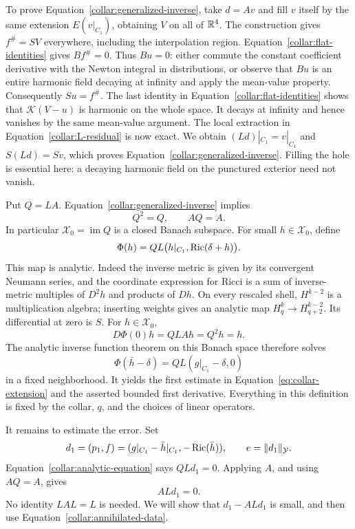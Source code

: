 To prove Equation~\eqref{collar:generalized-inverse}, take \(d=Av\)
and fill \(v\) itself by the same extension \(E(v|_{C_1})\), obtaining
\(V\) on all of \(\mathbb{R}^4\).  The construction gives \(f^\#=SV\)
everywhere, including the interpolation region.  Equation~\eqref{collar:flat-identities}
gives \(Bf^\#=0\).  Thus \(Bu=0\): either commute the constant
coefficient derivative with the Newton integral in distributions,
or observe that \(Bu\) is an entire harmonic field decaying at
infinity and apply the mean-value property.  Consequently
\(Su=f^\#\).  The last identity in Equation~\eqref{collar:flat-identities}
shows that \(\mathcal K(V-u)\) is harmonic on the whole space.
It decays at infinity and hence vanishes by the same mean-value
argument.  The local extraction in Equation~\eqref{collar:L-residual}
is now exact.  We obtain \((Ld)|_{C_1}=v|_{C_1}\) and \(S(Ld)=Sv\),
which proves Equation~\eqref{collar:generalized-inverse}.  Filling
the hole is essential here: a decaying harmonic field on the
punctured exterior need not vanish.

Put \(Q=LA\).  Equation~\eqref{collar:generalized-inverse} implies
\[
 Q^2=Q,\qquad AQ=A.
\]
In particular \(\mathcal X_0=\operatorname{im}Q\) is a closed
Banach subspace.  For small \(h\in\mathcal X_0\), define
\[
 \Phi(h)=QL\bigl(h|_{C_1},\operatorname{Ric}(\delta+h)\bigr).
\]
This map is analytic.  Indeed the inverse metric is given by its
convergent Neumann series, and the coordinate expression for Ricci
is a sum of inverse-metric multiples of \(D^2h\) and products of
\(Dh\).  On every rescaled shell, \(H^{k-2}\) is a multiplication
algebra; inserting weights gives an analytic map
\(H^k_q\to H^{k-2}_{q+2}\).  Its differential at zero is \(S\).
For \(h\in\mathcal X_0\),
\[
 D\Phi(0)h=QLAh=Q^2h=h.
\]
The analytic inverse function theorem on this Banach space
therefore solves
\begin{equation}
 \Phi(\bar h-\delta)=QL(g|_{C_1}-\delta,0)
 \label{collar:analytic-equation}
\end{equation}
in a fixed neighborhood.  It yields the first estimate in
Equation~\eqref{eq:collar-extension} and the asserted bounded
first derivative.  Everything in this definition is fixed by the
collar, \(q\), and the choices of linear operators.

It remains to estimate the error.  Set
\begin{equation}
 d_1=(p_1,f)
    =(g|_{C_1}-\bar h|_{C_1},-\operatorname{Ric}(\bar h)),
 \qquad e=\|d_1\|_{\mathcal Y}.
 \label{collar:error-data}
\end{equation}
Equation~\eqref{collar:analytic-equation} says \(QLd_1=0\).
Applying \(A\), and using \(AQ=A\), gives
\begin{equation}
 ALd_1=0.
 \label{collar:annihilated-data}
\end{equation}
No identity \(LAL=L\) is needed.  We will show that
\(d_1-ALd_1\) is small, and then use
Equation~\eqref{collar:annihilated-data}.

